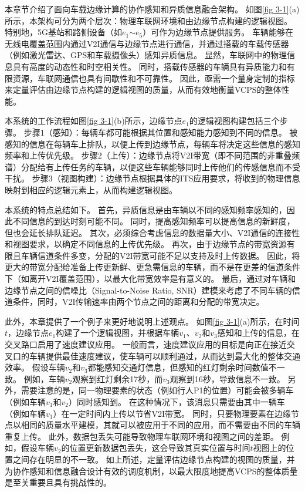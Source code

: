本章节介绍了面向车载边缘计算的协作感知和异质信息融合架构。
如图\ref{fig 3-1}(a)所示，本架构可分为两个层次：物理车联网环境和由边缘节点构建的逻辑视图。
特别地，5G基站和路侧设备（如$e_1$$\sim$$e_5$）可作为边缘节点提供服务。
车辆能够在无线电覆盖范围内通过V2I通信与边缘节点进行通信，并通过搭载的车载传感器（例如激光雷达、GPS和车载摄像头）感知异质信息。
显然，车联网中的物理信息具有高度的动态性和时空相关性。
同时，搭载传感器的车辆具有异质能力和有限资源，车联网通信也具有间歇性和不可靠性。
因此，亟需一个量身定制的指标来定量评估由边缘节点构建的逻辑视图的质量，从而有效地衡量VCPS的整体性能。

本系统的工作流程如图\ref{fig 3-1}(b)所示，边缘节点$e_1$的逻辑视图构建包括三个步骤。
步骤1（感知）：每辆车都可能根据其位置和感知能力感知到不同的信息。
被感知的信息在每辆车上排队，以便上传到边缘节点，每辆车将决定这些信息的感知频率和上传优先级。
步骤2（上传）：边缘节点将V2I带宽（即不同范围的非重叠频谱）分配给有上传任务的车辆，以便这些车辆能够同时上传他们的传感信息而不受干扰。
步骤3（视图构建）：边缘节点根据具体的ITS应用要求，将收到的物理信息映射到相应的逻辑元素上，从而构建逻辑视图。

本系统的特点总结如下。
首先，异质信息是由车辆以不同的感知频率感知的，因此不同信息的到达时刻可能不同。
同时，提高感知频率可以提高信息的新鲜度，但也会延长排队延迟。
其次，必须综合考虑信息的数据量大小、V2I通信的连接性和视图要求，以确定不同信息的上传优先级。
再次，由于边缘节点的带宽资源有限且车辆信道条件多变，分配的V2I带宽可能不足以支持及时上传数据。
因此，将更大的带宽分配给准备上传更新鲜、更急需信息的车辆，而不是在更差的信道条件下（如离开V2I覆盖范围），以最大化带宽效率是有意义的。
最后，通过对车辆和边缘节点之间的信噪比（Signal-to-Noise Ratio,  SNR）建模来考虑了不同车辆的信道条件，同时，V2I传输速率由两个节点之间的距离和分配的带宽决定。

此外，本章提供了一个例子来更好地说明上述观点。
如图\ref{fig 3-1}(a)所示，在时间 $t$，边缘节点$e_1$构建了一个逻辑视图，并根据车辆$v_1$、$v_2$和$v_3$感知和上传的信息，在交叉路口启用了速度建议应用。
一般而言，速度建议应用的目标是向正在接近交叉口的车辆提供最佳速度建议，使车辆可以顺利通过，从而达到最大化的整体交通效率。
假设车辆$v_2$和$v_3$都能感知交通灯信息，但感知的红灯剩余时间数值不一致。
例如，车辆$v_2$观察到红灯剩余17秒，而$v_3$观察到16秒，导致信息不一致。
另外，需要注意的是，同一物理要素的状态（例如行人P1的位置）可能会被多辆车（例如车辆$v_1$和$v_2$）同时感知到。
在这种情况下，该消息只需要由其中一辆车（例如车辆$v_1$）在一定时间内上传以节省V2I带宽。
同时，只要物理要素在边缘节点以相同的质量水平建模，其就可以被应用于不同的应用，而不需要由不同的车辆重复上传。
此外，数据包丢失可能导致物理车联网环境和视图之间的差距。
例如，假设车辆$v_2$的位置更新数据包丢失，这会导致其真实位置与时间$t$视图上的位置之间存在明显的不一致。
如上所述，定量评估边缘节点构建的视图的质量，并为协作感知和信息融合设计有效的调度机制，以最大限度地提高VCPS的整体质量是至关重要且具有挑战性的。

